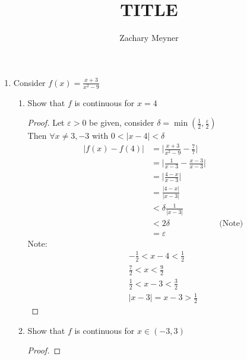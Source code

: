 \documentclass[12pt]{article}
\title{\large TITLE}
\author{\large Zachary Meyner}
\date{}
\begin{document}
\maketitle

\begin{enumerate}
	\item Consider $f(x) = \frac{x+3}{x^2-9}$
	      \begin{enumerate}
		      \item Show that $f$ is continuous for $x=4$
		            \begin{proof}
			            Let $\varepsilon > 0$ be given, consider $\delta = \min(\frac{1}{2}, \frac{\varepsilon}{2})$ \\
			            Then $\forall x \neq 3, -3$ with $0 < |x-4| < \delta$
			            \begin{align*}
				            \bigg| f(x) - f(4) \bigg| & = \bigg| \frac{x+3}{x^2-9} - \frac{7}{7} \bigg|                      \\
				                                      & = \bigg| \frac{1}{x-3} - \frac{x-3}{x-3} \bigg|                      \\
				                                      & = \bigg| \frac{4-x}{x-3} \bigg|                                      \\
				                                      & = \frac{|4-x|}{|x-3|}                                                \\
				                                      & < \delta \frac{1}{|x-3|}                                             \\
				                                      & < 2\delta                                       &  & \text{(Note)} \\
                                                      & = \varepsilon
			            \end{align*}
			            Note:
			            \begin{gather*}
				            -\frac{1}{2} < x-4 < \frac{1}{2} \\
				            \frac{7}{2} < x < \frac{9}{2} \\
				            \frac{1}{2} < x-3 < \frac{3}{2} \\
				            |x-3| = x-3 > \frac{1}{2}
			            \end{gather*}
		            \end{proof}
            \item Show that $f$ is continuous for $x \in (-3, 3)$
            \begin{proof}

\end{proof}
\end{enumerate}
\end{enumerate}
\end{document}
